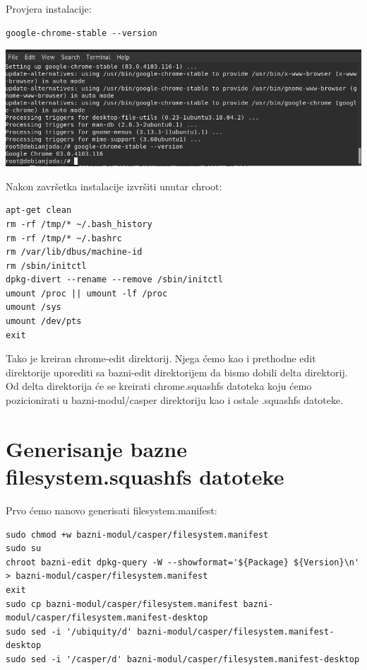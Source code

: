 \documentclass[12pt,vi]{mitthesis}
\begin{document}
Provjera instalacije:
\begin{lstlisting}[style=BashInputStyle]
google-chrome-stable --version
\end{lstlisting}
\includegraphics[width=\linewidth]{images/googlechromestableversion.png} 

\noindent
Nakon završetka instalacije izvršiti unutar chroot:
\begin{lstlisting}[style=BashInputStyle]
apt-get clean
rm -rf /tmp/* ~/.bash_history
rm -rf /tmp/* ~/.bashrc
rm /var/lib/dbus/machine-id
rm /sbin/initctl
dpkg-divert --rename --remove /sbin/initctl
umount /proc || umount -lf /proc
umount /sys
umount /dev/pts
exit
\end{lstlisting}

Tako je kreiran chrome-edit direktorij. Njega ćemo kao i prethodne edit direktorije uporediti sa bazni-edit direktorijem da bismo dobili delta direktorij. Od delta direktorija će se kreirati chrome.squashfs datoteka koju ćemo pozicionirati u bazni-modul/casper direktoriju kao i ostale .squashfs datoteke.

\section*{Generisanje bazne filesystem.squashfs datoteke}
\indent
Prvo ćemo nanovo generisati filesystem.manifest:
\begin{lstlisting}[style=BashInputStyle]
sudo chmod +w bazni-modul/casper/filesystem.manifest
sudo su
chroot bazni-edit dpkg-query -W --showformat='${Package} ${Version}\n' > bazni-modul/casper/filesystem.manifest
exit
sudo cp bazni-modul/casper/filesystem.manifest bazni-modul/casper/filesystem.manifest-desktop
sudo sed -i '/ubiquity/d' bazni-modul/casper/filesystem.manifest-desktop
sudo sed -i '/casper/d' bazni-modul/casper/filesystem.manifest-desktop
\end{lstlisting}
\end{document}

